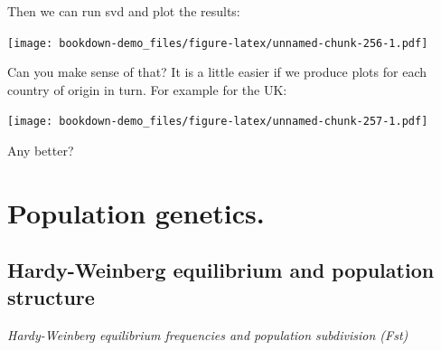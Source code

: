 \documentclass[
]{book}
\newenvironment{Shaded}{\begin{snugshade}}{\end{snugshade}}
\newcommand{\AttributeTok}[1]{\textcolor[rgb]{0.77,0.63,0.00}{#1}}
\newcommand{\DecValTok}[1]{\textcolor[rgb]{0.00,0.00,0.81}{#1}}
\newcommand{\FloatTok}[1]{\textcolor[rgb]{0.00,0.00,0.81}{#1}}
\newcommand{\FunctionTok}[1]{\textcolor[rgb]{0.00,0.00,0.00}{#1}}
\newcommand{\NormalTok}[1]{#1}
\newcommand{\OtherTok}[1]{\textcolor[rgb]{0.56,0.35,0.01}{#1}}
\newcommand{\SpecialCharTok}[1]{\textcolor[rgb]{0.00,0.00,0.00}{#1}}
\newcommand{\StringTok}[1]{\textcolor[rgb]{0.31,0.60,0.02}{#1}}
\begin{document}
Then we can run svd and plot the results:

\begin{Shaded}
\end{Shaded}

\texttt{[image: bookdown-demo\_files/figure-latex/unnamed-chunk-256-1.pdf]}

Can you make sense of that? It is a little easier if we produce plots for each country of origin in turn. For example for the UK:

\begin{Shaded}
\end{Shaded}

\texttt{[image: bookdown-demo\_files/figure-latex/unnamed-chunk-257-1.pdf]}

Any better?

\hypertarget{Population-genetics}{%
\chapter{Population genetics.}\label{Population-genetics}}

\hypertarget{hardy-weinberg-equilibrium-and-population-structure}{%
\section{Hardy-Weinberg equilibrium and population structure}\label{hardy-weinberg-equilibrium-and-population-structure}}

\emph{Hardy-Weinberg equilibrium frequencies and population subdivision (Fst)}
\end{document}
